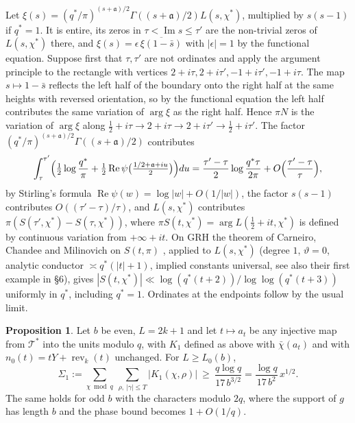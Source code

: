 \documentclass[11pt]{amsart}
\makeatletter
\theoremstyle{definition}
\newtheorem{proposition}[theorem]{Proposition}
\numberwithin{equation}{section}
\renewenvironment{proof}[1][\proofname]{\par\pushQED{\qed}\normalfont\topsep6\p@\@plus6\p@\relax\trivlist\item[\hskip\labelsep\upshape#1.]\ignorespaces}{\popQED\endtrivlist\@endpefalse}
\newcommand{\rev}{\operatorname{rev}}
\newcommand{\cT}{\mathcal{T}}
\newcommand{\re}{\operatorname{Re}}
\makeatother
\begin{document}
\begin{proof}
Let $\xi(s)=(q^*/\pi)^{(s+\mathfrak a)/2}\Gamma((s+\mathfrak a)/2)L(s,\chi^*)$, multiplied by $s(s-1)$ if $q^*=1$. It is entire, its zeros in $\tau<\operatorname{Im}s\le\tau'$ are the non-trivial zeros of $L(s,\chi^*)$ there, and $\xi(s)=\epsilon\,\overline{\xi(1-\bar s)}$ with $|\epsilon|=1$ by the functional equation. Suppose first that $\tau,\tau'$ are not ordinates and apply the argument principle to the rectangle with vertices $2+i\tau,2+i\tau',-1+i\tau',-1+i\tau$. The map $s\mapsto1-\bar s$ reflects the left half of the boundary onto the right half at the same heights with reversed orientation, so by the functional equation the left half contributes the same variation of $\arg\xi$ as the right half. Hence $\pi N$ is the variation of $\arg\xi$ along $\frac12+i\tau\to2+i\tau\to2+i\tau'\to\frac12+i\tau'$. The factor $(q^*/\pi)^{(s+\mathfrak a)/2}\Gamma((s+\mathfrak a)/2)$ contributes
\[
\int_\tau^{\tau'}\Bigl(\tfrac12\log\frac{q^*}\pi+\tfrac12\re\psi\bigl(\tfrac{1/2+\mathfrak a+iu}2\bigr)\Bigr)du=\frac{\tau'-\tau}2\log\frac{q^*\tau}{2\pi}+O\Bigl(\frac{\tau'-\tau}\tau\Bigr),
\]
by Stirling's formula $\re\psi(w)=\log|w|+O(1/|w|)$, the factor $s(s-1)$ contributes $O((\tau'-\tau)/\tau)$, and $L(s,\chi^*)$ contributes $\pi(S(\tau',\chi^*)-S(\tau,\chi^*))$, where $\pi S(t,\chi^*)=\arg L(\frac12+it,\chi^*)$ is defined by continuous variation from $+\infty+it$. On GRH the theorem of Carneiro, Chandee and Milinovich on $S(t,\pi)$ \cite[Theorem~5]{CCM}, applied to $L(s,\chi^*)$ (degree $1$, $\vartheta=0$, analytic conductor $\asymp q^*(|t|+1)$, implied constants universal, see also their first example in \S6), gives $|S(t,\chi^*)|\ll\log(q^*(t+2))/\log\log(q^*(t+3))$ uniformly in $q^*$, including $q^*=1$. Ordinates at the endpoints follow by the usual limit.
\end{proof}


\begin{proposition}\label{prop:N}
Let $b$ be even, $L=2k+1$ and let $t\mapsto a_t$ be any injective map from $\cT^*$ into the units modulo $q$, with $K_1$ defined as above with $\bar\chi(a_t)$ and with $n_0(t)=tY+\rev_k(t)$ unchanged. For $L\ge L_0(b)$,
\[
\Sigma_1:=\sum_{\chi\bmod q}\ \sum_{\rho,\ |\gamma|\le T}|K_1(\chi,\rho)|\ \ge\ \frac{q\log q}{17\,b^{3/2}}=\frac{\log q}{17\,b^2}\,x^{1/2}.
\]
The same holds for odd $b$ with the characters modulo $2q$, where the support of $g$ has length $b$ and the phase bound becomes $1+O(1/q)$.
\end{proposition}
\end{document}
